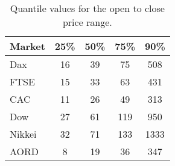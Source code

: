\begin{table}[!htbp] \centering 
  \caption[Quantiles of the open to close price range]{Quantile values for the open to close price range.} 
  \label{tab:OCQuantile}
\begin{tabular}{lcccc} 
\toprule 
Market & 25\% & 50\% & 75\% & 90\% \\ 
\midrule
Dax  & 16  & 39 & 75 & 508  \\ 
FTSE & 15  & 33 & 63 & 431 \\ 
CAC  & 11  & 26 & 49 & 313 \\ 
Dow  & 27 & 61  & 119 & 950 \\ 
Nikkei & 32  & 71  & 133 & 1333 \\ 
AORD   & 8  & 19  & 36 & 347 \\ 
\bottomrule
\end{tabular} 
\end{table} 



%
%


